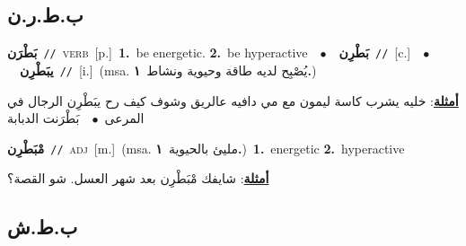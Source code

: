 \documentclass[10pt,a4paper,twoside]{article} %
\begin{document}
\begin{multicols}{2}
\vspace{-3mm}
\subsection*{\color{blue}\foreignlanguage{arabic}{ب.ط.ر.ن}\color{blue}{}} 

{\setlength\topsep{0pt}\textbf{\foreignlanguage{arabic}{بَطْرَن}}\ {\color{gray}\texttt{//}\color{black}}\ \textsc{verb}\ [p.]\ \textbf{1.}~be energetic.  \textbf{2.}~be hyperactive\ \ $\bullet$\ \ \setlength\topsep{0pt}\textbf{\foreignlanguage{arabic}{بَطْرِن}}\ {\color{gray}\texttt{//}\color{black}}\ [c.]\ \ $\bullet$\ \ \setlength\topsep{0pt}\textbf{\foreignlanguage{arabic}{يبَطْرِن}}\ {\color{gray}\texttt{//}\color{black}}\ [i.]\ \color{gray}(msa. \foreignlanguage{arabic}{يُصْبِح لديه طاقة وحيوية ونشاط}~\foreignlanguage{arabic}{\textbf{١.}})\color{black}\  \begin{flushright}\color{gray}\foreignlanguage{arabic}{\textbf{\underline{\foreignlanguage{arabic}{أمثلة}}}: خليه يشرب كاسة ليمون مع مي دافيه عالريق وشوف كيف رح يبَطْرِن الرجال في المرعى\ $\bullet$\ \  بَطْرَنت الدبابة}\end{flushright}\color{black}} \vspace{2mm}

{\setlength\topsep{0pt}\textbf{\foreignlanguage{arabic}{مْبَطْرِن}}\ {\color{gray}\texttt{//}\color{black}}\ \textsc{adj}\ [m.]\ \color{gray}(msa. \foreignlanguage{arabic}{مليئ بالحيوية}~\foreignlanguage{arabic}{\textbf{١.}})\color{black}\ \textbf{1.}~energetic  \textbf{2.}~hyperactive\  \begin{flushright}\color{gray}\foreignlanguage{arabic}{\textbf{\underline{\foreignlanguage{arabic}{أمثلة}}}: شايفك مْبَطْرِن بعد شهر العسل. شو القصة؟}\end{flushright}\color{black}} \vspace{2mm}

\vspace{-3mm}
\subsection*{\color{blue}\foreignlanguage{arabic}{ب.ط.ش}\color{blue}{}} 


\end{multicols}
\end{document}
